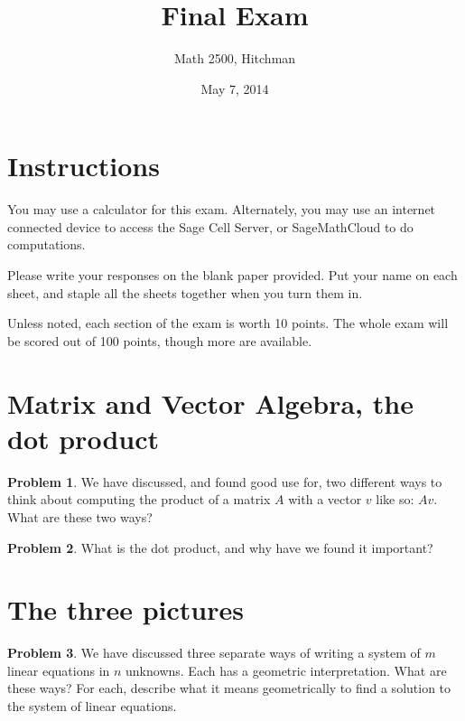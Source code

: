 \documentclass[11pt]{amsart}
\theoremstyle{definition}
\newtheorem{problem}{Problem}[section]
\begin{document}
\title{Final Exam}
\author{Math 2500, Hitchman}
\date{May 7, 2014}

\maketitle

\section*{Instructions}

You may use a calculator for this exam. Alternately, you may use an internet connected device to access the Sage Cell Server, or SageMathCloud to do computations.

Please write your responses on the blank paper provided. Put your name on each sheet, and staple all the sheets together when you turn them in.

Unless noted, each section of the exam is worth 10 points. The whole exam will be scored out of 100 points, though more are available.



\section{Matrix and Vector Algebra, the dot product}

\begin{problem}
We have discussed, and found good use for, two different ways to think about computing the product of a matrix $A$ with a vector $v$ like so: $Av$. What are these two ways?
\end{problem}

\begin{problem}
What is the dot product, and why have we found it important?
\end{problem}


\vspace{1cm}
\section{The three pictures}

\begin{problem}
We have discussed three separate ways of writing a system of $m$ linear equations in $n$ unknowns. Each has a geometric interpretation. What are these ways? For each, describe what it means geometrically to find a solution to the system of linear equations.
\end{problem}
\end{document}
